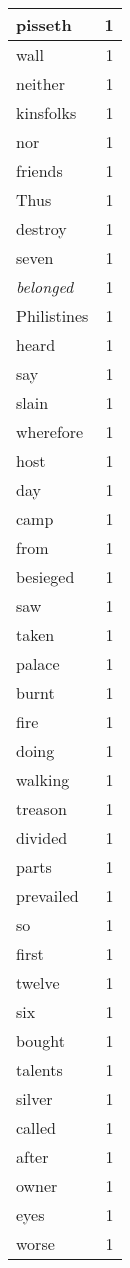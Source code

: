 \begin{center}
\begin{longtable}{l|r}
pisseth & 1\\ \hline 
wall & 1\\ \hline 
neither & 1\\ \hline 
kinsfolks & 1\\ \hline 
nor & 1\\ \hline 
friends & 1\\ \hline 
Thus & 1\\ \hline 
destroy & 1\\ \hline 
seven & 1\\ \hline 
\emph{belonged} & 1\\ \hline 
Philistines & 1\\ \hline 
heard & 1\\ \hline 
say & 1\\ \hline 
slain & 1\\ \hline 
wherefore & 1\\ \hline 
host & 1\\ \hline 
day & 1\\ \hline 
camp & 1\\ \hline 
from & 1\\ \hline 
besieged & 1\\ \hline 
saw & 1\\ \hline 
taken & 1\\ \hline 
palace & 1\\ \hline 
burnt & 1\\ \hline 
fire & 1\\ \hline 
doing & 1\\ \hline 
walking & 1\\ \hline 
treason & 1\\ \hline 
divided & 1\\ \hline 
parts & 1\\ \hline 
prevailed & 1\\ \hline 
so & 1\\ \hline 
first & 1\\ \hline 
twelve & 1\\ \hline 
six & 1\\ \hline 
bought & 1\\ \hline 
talents & 1\\ \hline 
silver & 1\\ \hline 
called & 1\\ \hline 
after & 1\\ \hline 
owner & 1\\ \hline 
eyes & 1\\ \hline 
worse & 1\\ \hline 

\end{longtable}
\end{center}
